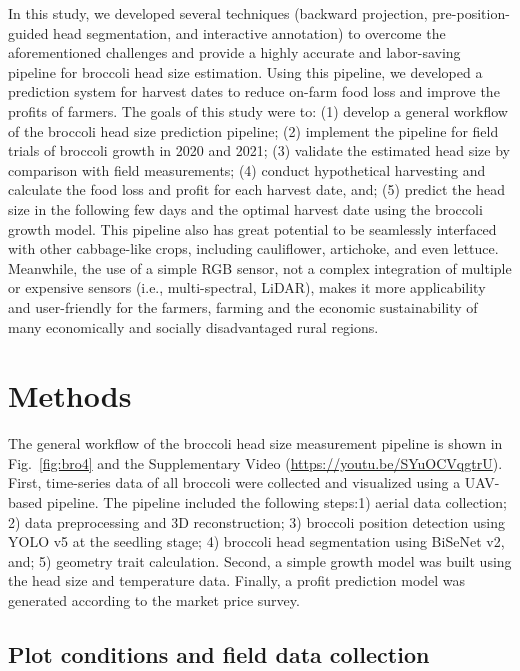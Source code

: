 In this study, we developed several techniques (backward projection, pre-position-guided head segmentation, and interactive annotation) to overcome the aforementioned challenges and provide a highly accurate and labor-saving pipeline for broccoli head size estimation. Using this pipeline, we developed a prediction system for harvest dates to reduce on-farm food loss and improve the profits of farmers. The goals of this study were to: (1) develop a general workflow of the broccoli head size prediction pipeline; (2) implement the pipeline for field trials of broccoli growth in 2020 and 2021; (3) validate the estimated head size by comparison with field measurements; (4) conduct hypothetical harvesting and calculate the food loss and profit for each harvest date, and; (5) predict the head size in the following few days and the optimal harvest date using the broccoli growth model. This pipeline also has great potential to be seamlessly interfaced with other cabbage-like crops, including cauliflower, artichoke, and even lettuce. Meanwhile, the use of a simple RGB sensor, not a complex integration of multiple or expensive sensors (i.e., multi-spectral, LiDAR), makes it more applicability and user-friendly for the farmers, farming and the economic sustainability of many economically and socially disadvantaged rural regions. 

\section{Methods}

The general workflow of the broccoli head size measurement pipeline is shown in Fig.~\ref{fig:bro4} and the Supplementary Video (\url{https://youtu.be/SYuOCVqgtrU}). First, time-series data of all broccoli were collected and visualized using a UAV-based pipeline. The pipeline included the following steps:1) aerial data collection; 2) data preprocessing and 3D reconstruction; 3) broccoli position detection using YOLO v5 at the seedling stage; 4) broccoli head segmentation using BiSeNet v2, and; 5) geometry trait calculation. Second, a simple growth model was built using the head size and temperature data. Finally, a profit prediction model was generated according to the market price survey.



\subsection{Plot conditions and field data collection}

